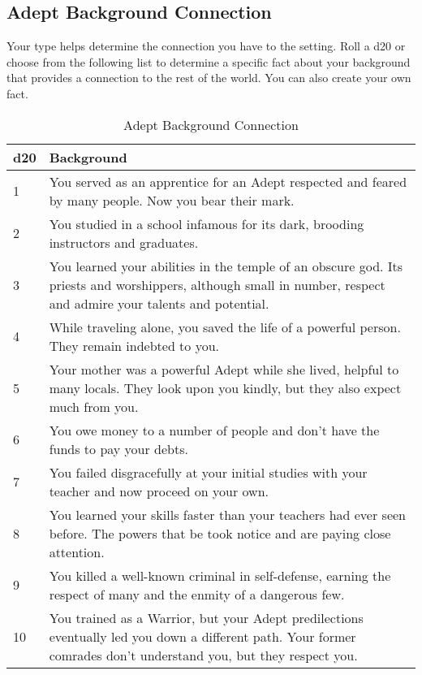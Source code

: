\begin{multicols}{2}
\subsection{Adept Background Connection}

Your type helps determine the connection you have to the setting. Roll a d20 or choose from the following list to determine a specific fact about your background that provides a connection to the rest of the world. You can also create your own fact.

\begin{table*}
\centering

\caption{Adept Background Connection}
\label{tab:Adept Background Connection}

\begin{tabularx}{\textwidth}{| p{} | p{} |}
\hline
\textbf{d20} & \textbf{Background} \\
\hline
1 & You served as an apprentice for an Adept respected and feared by many people. Now you bear their mark. \\ \hline
2 & You studied in a school infamous for its dark, brooding instructors and graduates. \\ \hline
3 & You learned your abilities in the temple of an obscure god. Its priests and worshippers, although small in number, respect and admire your talents and potential.  \\ \hline
4 & While traveling alone, you saved the life of a powerful person. They remain indebted to you.  \\ \hline
5 & Your mother was a powerful Adept while she lived, helpful to many locals. They look upon you kindly, but they also expect much from you.  \\ \hline
6 & You owe money to a number of people and don’t have the funds to pay your debts. \\ \hline
7 & You failed disgracefully at your initial studies with your teacher and now proceed on your own. \\ \hline
8 & You learned your skills faster than your teachers had ever seen before. The powers that be took notice and are paying close attention.  \\ \hline
9 & You killed a well-known criminal in self-defense, earning the respect of many and the enmity of a dangerous few.  \\ \hline
10 & You trained as a Warrior, but your Adept predilections eventually led you down a different path. Your former comrades don’t understand you, but they respect you.  \\ \hline

\end{tabularx}
\end{table*}
\end{multicols}
